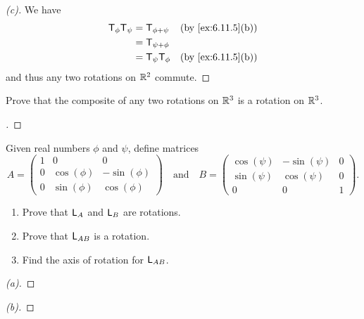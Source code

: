 \begin{proof}[(c)]
  We have
  \begin{align*}
    \T_{\phi} \T_{\psi} & = \T_{\phi + \psi}    &  & \by{ex:6.11.5}[b] \\
                        & = \T_{\psi + \phi}                           \\
                        & = \T_{\psi} \T_{\phi} &  & \by{ex:6.11.5}[b]
  \end{align*}
  and thus any two rotations on \(\mathbb{R}^2\) commute.
\end{proof}

\begin{ex}\label{ex:6.11.6}
  Prove that the composite of any two rotations on \(\mathbb{R}^3\) is a rotation on \(\mathbb{R}^3\).
\end{ex}

\begin{proof}[]

\end{proof}

\begin{ex}\label{ex:6.11.7}
  Given real numbers \(\phi\) and \(\psi\), define matrices
  \[
    A = \begin{pmatrix}
      1 & 0          & 0           \\
      0 & \cos(\phi) & -\sin(\phi) \\
      0 & \sin(\phi) & \cos(\phi)
    \end{pmatrix} \quad \text{and} \quad B = \begin{pmatrix}
      \cos(\psi) & -\sin(\psi) & 0 \\
      \sin(\psi) & \cos(\psi)  & 0 \\
      0          & 0           & 1
    \end{pmatrix}.
  \]
  \begin{enumerate}
    \item Prove that \(\mathsf{L}_{A}\) and \(\mathsf{L}_{B}\) are rotations.
    \item Prove that \(\mathsf{L}_{AB}\) is a rotation.
    \item Find the axis of rotation for \(\mathsf{L}_{AB}\).
  \end{enumerate}
\end{ex}

\begin{proof}[(a)]

\end{proof}

\begin{proof}[(b)]

\end{proof}

